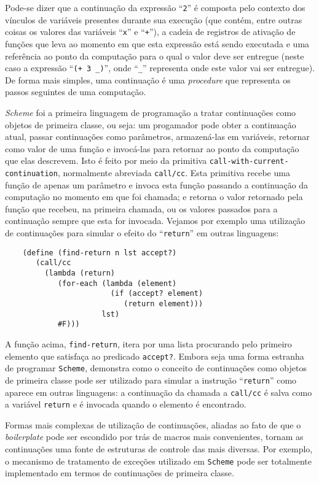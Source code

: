 Pode-se dizer que a continuação da expressão ``\texttt{2}'' é composta pelo
contexto dos vínculos de variáveis presentes durante sua execução (que contém,
entre outras coisas os valores das variáveis ``\texttt{x}'' e ``\texttt{+}''),
a cadeia de registros de ativação de funções que leva ao momento em que esta
expressão está sendo executada e uma referência ao ponto da computação para o
qual o valor deve ser entregue (neste caso a expressão ``\texttt{(+ 3 \_)}'',
onde ``\texttt{\_}'' representa onde este valor vai ser entregue). De forma 
mais simples, uma continuação é uma \textit{procedure} que representa os passos
seguintes de uma computação.

\textit{Scheme} foi a primeira linguagem de programação a tratar continuações
como objetos de primeira classe, ou seja: um progamador pode obter a
continuação atual, passar continuações como parâmetros, armazená-las em
variáveis, retornar como valor de uma função e invocá-las para retornar ao
ponto da computação que elas descrevem. Isto é feito por meio da primitiva
\texttt{call-with-current-continuation}, normalmente abreviada \texttt{call/cc}.
Esta primitiva recebe uma função de apenas um parâmetro e invoca esta função
passando a continuação da computação no momento em que foi chamada; e retorna
o valor retornado pela função que recebeu, na primeira chamada, ou os valores
passados para a continuação sempre que esta for invocada. Vejamos por exemplo
uma utilização de continuações para simular o efeito do ``\texttt{return}'' em 
outras linguagens:

\begin{lstlisting}
    (define (find-return n lst accept?)
       (call/cc 
         (lambda (return)
            (for-each (lambda (element)
                        (if (accept? element)
                           (return element)))
                      lst)
            #F)))
\end{lstlisting}

A função acima, \texttt{find-return}, itera por uma lista procurando pelo 
primeiro elemento que satisfaça ao predicado \texttt{accept?}. Embora seja uma 
forma estranha de programar \texttt{Scheme}, demonstra como o conceito de 
continuações como objetos de primeira classe pode ser utilizado para simular
a instrução ``\texttt{return}'' como aparece em outras linguagens: a continuação
da chamada a \texttt{call/cc} é salva como a variável \texttt{return} e é 
invocada quando o elemento é encontrado. 

Formas mais complexas de utilização de continuações, aliadas ao fato de que o
\textit{boilerplate} pode ser escondido por trás de macros mais convenientes,
tornam as continuações uma fonte de estruturas de controle das mais diversas.
Por exemplo, o mecanismo de tratamento de exceções utilizado em \texttt{Scheme}
pode ser totalmente implementado em termos de continuações de primeira classe.

